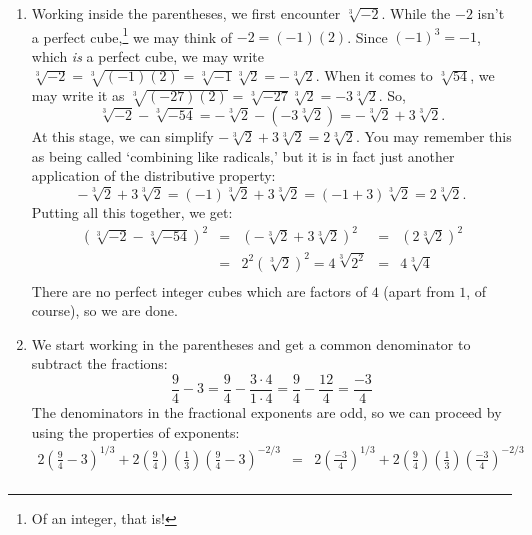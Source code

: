 \documentclass{ximera}
\begin{document}
\begin{example}
\begin{enumerate}
\[\begin{array}{rclcl}
& = & \frac{2 \left( \frac{\sqrt{3}}{3}\right) \cdot 3}{\left(1 - \left( \frac{1}{3} \right)\right) \cdot 3} & = & \frac{\frac{2 \cdot \sqrt{3} \cdot \cancel{3}}{\cancel{3}}}{1\cdot 3 -  \frac{1\cdot \cancel{3}}{\cancel{3}}} \\ 

& = & \frac{2 \sqrt{3}}{3 - 1} & = & \frac{\cancel{2} \sqrt{3}}{\cancel{2}} = \sqrt{3} \\ \end{array} \]

\item  Working inside the parentheses, we first encounter $\sqrt[3]{-2}$.  While the $-2$ isn't a perfect cube,\footnote{Of an integer, that is!} we may think of $-2 = (-1)(2)$.  Since $(-1)^3 = -1$, which \textit{is} a perfect cube, we may write $\sqrt[3]{-2} = \sqrt[3]{(-1)(2)} = \sqrt[3]{-1} \sqrt[3]{2} = - \sqrt[3]{2}$. When it comes to $\sqrt[3]{54}$, we may write it as $\sqrt[3]{(-27)(2)} = \sqrt[3]{-27} \sqrt[3]{2} = -3 \sqrt[3]{2}$.  So, \[\sqrt[3]{-2} - \sqrt[3]{-54} = -\sqrt[3]{2} - (-3\sqrt[3]{2}) = -\sqrt[3]{2} + 3 \sqrt[3]{2}.\]  At this stage, we can simplify $-\sqrt[3]{2} + 3 \sqrt[3]{2} = 2 \sqrt[3]{2}$.  You may remember this as being called `combining like radicals,' but it is in fact just another application of the distributive property:  \[-\sqrt[3]{2} + 3\sqrt[3]{2} = (-1)\sqrt[3]{2} + 3 \sqrt[3]{2} = (-1+3)\sqrt[3]{2} = 2\sqrt[3]{2}.\]  Putting all this together, we get:\[ \begin{array}{rclcl}
  (\sqrt[3]{-2} - \sqrt[3]{-54})^2 & = & (-\sqrt[3]{2} + 3 \sqrt[3]{2})^2 & = & (2 \sqrt[3]{2})^2  \\  
																	 & = & 2^2 (\sqrt[3]{2})^2 = 4 \sqrt[3]{2^2} & = & 4 \sqrt[3]{4} \\ \end{array} \] There are no perfect integer cubes which are factors of $4$ (apart from $1$, of course), so we are done.

\pagebreak

\item  We start working in the parentheses and get a common denominator to subtract the fractions:\[ \frac{9}{4} - 3 = \frac{9}{4} - \frac{3 \cdot 4}{1 \cdot 4} = \frac{9}{4} - \frac{12}{4} = \frac{-3}{4}  \] The denominators in the fractional exponents are odd, so we can proceed by using the properties of exponents:\[ \begin{array}{rclr}

2 \left(\frac{9}{4} - 3\right)^{1/3} + 2\left(\frac{9}{4}\right)\left(\frac{1}{3}\right)\left(\frac{9}{4}-3\right)^{-2/3} & = &2 \left(\frac{-3}{4} \right)^{1/3} + 2\left(\frac{9}{4}\right)\left(\frac{1}{3}\right)\left(\frac{-3}{4}\right)^{-2/3} & \\  


\end{array}\]
\end{enumerate}
\end{example}
\end{document}
